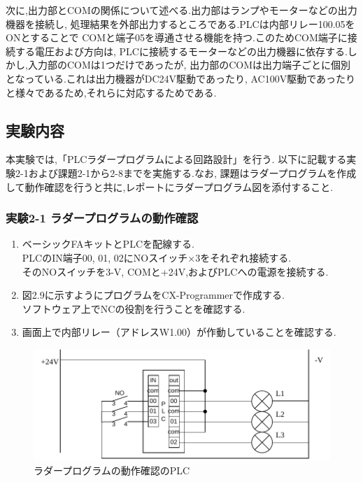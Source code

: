 次に,出力部とCOMの関係について述べる.出力部はランプやモーターなどの出力機器を接続し,
処理結果を外部出力するところである.PLCは内部リレー100.05をONとすることで
COMと端子05を導通させる機能を持つ.このためCOM端子に接続する電圧および方向は,
PLCに接続するモーターなどの出力機器に依存する.しかし,入力部のCOMは1つだけであったが,
出力部のCOMは出力端子ごとに個別となっている.これは出力機器がDC24V駆動であったり,
AC100V駆動であったりと様々であるため,それらに対応するためである.

\subsection{実験内容}

本実験では,「PLCラダープログラムによる回路設計」を行う.
以下に記載する実験2-1および課題2-1から2-8までを実施する.なお,
課題はラダープログラムを作成して動作確認を行うと共に,レポートにラダープログラム図を添付すること.

\subsubsection*{実験2-1 ラダープログラムの動作確認}
\begin{enumerate}
  \item ベーシックFAキットとPLCを配線する.\\
        PLCのIN端子00, 01, 02にNOスイッチ×3をそれぞれ接続する.\\
        そのNOスイッチを3-V, COMと+24V,およびPLCへの電源を接続する.
  \item 図2.9に示すようにプログラムをCX-Programmerで作成する.\\
        ソフトウェア上でNCの役割を行うことを確認する.
  \item 画面上で内部リレー（アドレスW1.00）が作動していることを確認する.
\end{enumerate}



\begin{figure}[H]
  \centering
  \includegraphics[scale=0.5]{sozai/5.pdf}
  \caption{ラダープログラムの動作確認のPLC}
\end{figure}

